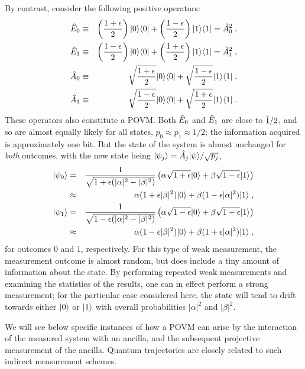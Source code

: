By contrast, consider the following positive operators:
\begin{eqnarray}
{\hat E}_0 &\equiv& \left( {1+\epsilon \over 2} \right) {| 0 \rangle}{\langle 0 |}
  + \left( {1-\epsilon \over 2} \right) {| 1 \rangle}{\langle 1 |}
  = {\hat A}_0^2 \;,\nonumber\\ 
{\hat E}_1 &\equiv& \left( {1-\epsilon \over 2} \right) {| 0 \rangle}{\langle 0 |}
  + \left( {1+\epsilon \over 2} \right) {| 1 \rangle}{\langle 1 |}
  = {\hat A}_1^2 \;, \nonumber\\
{\hat A}_0 &\equiv& \sqrt{1+\epsilon \over 2} {| 0 \rangle}{\langle 0 |}
  + \sqrt{1-\epsilon \over 2} {| 1 \rangle}{\langle 1 |} \;, \nonumber\\
{\hat A}_1 &\equiv& \sqrt{1-\epsilon \over 2} {| 0 \rangle}{\langle 0 |}
  + \sqrt{1+\epsilon \over 2} {| 1 \rangle}{\langle 1 |} \;.
\label{weak2}
\end{eqnarray}
These operators also constitute a POVM.  Both ${\hat E}_0$ and ${\hat E}_1$ are close
to ${\hat 1}/2$, and so are almost equally likely for all states,
$p_0 \approx p_1 \approx 1/2$; the information acquired is approximately
one bit.  But the state of the system is almost unchanged for {\it both}
outcomes, with the new state being ${| \psi_j \rangle} = {\hat A}_j{| \psi \rangle}/\sqrt{p_j}$,
\begin{eqnarray}
{| \psi_0 \rangle} &=& {1\over\sqrt{1+\epsilon(|\alpha|^2-|\beta|^2)}}
  \left( \alpha\sqrt{1+\epsilon}{| 0 \rangle}
  + \beta\sqrt{1-\epsilon}{| 1 \rangle} \right) \nonumber\\
&\approx& \alpha(1+\epsilon|\beta|^2){| 0 \rangle}
  + \beta(1-\epsilon|\alpha|^2){| 1 \rangle} \;, \nonumber\\
{| \psi_1 \rangle} &=& {1\over\sqrt{1-\epsilon(|\alpha|^2-|\beta|^2)}}
  \left( \alpha\sqrt{1-\epsilon}{| 0 \rangle}
  + \beta\sqrt{1+\epsilon}{| 1 \rangle} \right) \nonumber\\
&\approx& \alpha(1-\epsilon|\beta|^2){| 0 \rangle}
  + \beta(1+\epsilon|\alpha|^2){| 1 \rangle} \;,
\end{eqnarray}
for outcomes 0 and 1, respectively.  For this type of weak measurement,
the measurement outcome is almost random, but does include a tiny amount
of information about the state.  By performing repeated weak measurements
and examining the statistics of the results, one can in effect perform
a strong measurement; for the particular case considered here, the
state will tend to drift towards either ${| 0 \rangle}$ or ${| 1 \rangle}$ with
overall probabilities $|\alpha|^2$ and $|\beta|^2$.

We will see below specific instances of how a POVM can arise by the
interaction of the measured system with an ancilla,
and the subsequent projective measurement of the
ancilla.  Quantum trajectories are
closely related to such indirect measurement schemes.



